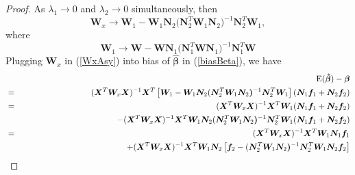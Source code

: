 \documentclass[review]{elsarticle}
\begin{document}
\begin{proof}
As $\lambda_1 \to 0$ and $\lambda_2 \to 0$ simultaneously, then  
\begin{equation} \label{WxAsy}
\boldsymbol W_x  \to  \boldsymbol W_1 
-
\boldsymbol W_1 \boldsymbol N_2 
(\boldsymbol N_2^T  \boldsymbol W_1 \boldsymbol N_2 \boldsymbol )^{-1} 
\boldsymbol N_2^T  \boldsymbol W_1,
\end{equation}
where 
\begin{equation} \label{W1Asy}
 \boldsymbol W_1 \to
\boldsymbol W 
-
\boldsymbol W \boldsymbol N_1 
(\boldsymbol N_1^T  \boldsymbol W \boldsymbol N_1 \boldsymbol)^{-1} 
\boldsymbol N_1^T  \boldsymbol W
\end{equation}
Plugging $\bm W_x$ in (\ref{WxAsy}) into bias of $\bm {\hat \beta}$ in (\ref{biasBeta}), we have 
\begin{eqnarray}
&& 
{\rm E}(\boldsymbol {\hat \beta})  -  \boldsymbol \beta  \nonumber \\
&=& 
(\boldsymbol X^T  \boldsymbol W_x \boldsymbol X )^{-1} \boldsymbol X^T 
\left[\boldsymbol W_1 
-
\boldsymbol W_1 \boldsymbol N_2 
(\boldsymbol N_2^T  \boldsymbol W_1 \boldsymbol N_2 \boldsymbol )^{-1} 
\boldsymbol N_2^T  \boldsymbol W_1 \right] 
(\boldsymbol N_{1} \boldsymbol f_1 + 
\boldsymbol N_{2} \boldsymbol f_2) \nonumber\\
&=& 
(\boldsymbol X^T  \boldsymbol W_x \boldsymbol X )^{-1} \boldsymbol X^T 
\boldsymbol W_1 (\boldsymbol N_{1} \boldsymbol f_1 + 
\boldsymbol N_{2} \boldsymbol f_2) \nonumber\\
&& \hspace{4cm}
-
(\boldsymbol X^T  \boldsymbol W_x \boldsymbol X )^{-1} \boldsymbol X^T
\boldsymbol W_1 \boldsymbol N_2 
(\boldsymbol N_2^T  \boldsymbol W_1 \boldsymbol N_2 \boldsymbol )^{-1} 
\boldsymbol N_2^T  \boldsymbol W_1 
(\boldsymbol N_{1} \boldsymbol f_1 + 
\boldsymbol N_{2} \boldsymbol f_2) \nonumber\\
&=& 
(\boldsymbol X^T  \boldsymbol W_x \boldsymbol X )^{-1} \boldsymbol X^T 
\boldsymbol W_1 \boldsymbol N_{1} \boldsymbol f_1 \nonumber\\
&& 
+ 
(\boldsymbol X^T  \boldsymbol W_x \boldsymbol X )^{-1} \boldsymbol X^T 
\boldsymbol W_1 \boldsymbol N_{2} 
\left[\boldsymbol f_2 - (\boldsymbol N_2^T  \boldsymbol W_1 \boldsymbol N_2 \boldsymbol )^{-1} 
\boldsymbol N_2^T  \boldsymbol W_1 
\boldsymbol N_{2} \boldsymbol f_2 \right] \nonumber\\ 

\end{eqnarray}
\end{proof}
\end{document}
